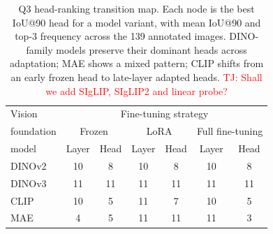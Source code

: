 \documentclass[lineno,pdflatex,sn-mathphys-num]{sn-jnl}%
\theoremstyle{thmstyleone}%
\theoremstyle{thmstyletwo}%
\theoremstyle{thmstylethree}%
\begin{document}


\begin{table}[!h]
\caption{Q3 head-ranking transition map. Each node is the best IoU@90 head for a model variant, with mean IoU@90 and top-3 frequency across the 139 annotated images. DINO-family models preserve their dominant heads across adaptation; MAE shows a mixed pattern; CLIP shifts from an early frozen head to late-layer adapted heads. \textcolor{red}{TJ: Shall we add SIgLIP, SIgLIP2 and linear probe?}\label{table RQ3 head ranking}}
\begin{tabular}{l|cccccc}
\hline
Vision & \multicolumn{6}{c}{Fine-tuning strategy}  \\
foundation & \multicolumn{2}{c}{Frozen} & \multicolumn{2}{c}{LoRA} & \multicolumn{2}{l}{Full fine-tuning} \\
model & Layer & Head & Layer & Head & Layer & Head \\ \hline
DINOv2 & 10 & 8 & 10 & 8 & 10 & 8 \\
DINOv3 & 11 & 11 & 11 & 11 & 11 & 11 \\
CLIP & 10 & 5 & 11 & 7 & 10 & 5 \\
MAE & 4 & 5 & 11 & 11 & 11 & 3 \\ \hline
\end{tabular}
\end{table}


\end{document}
